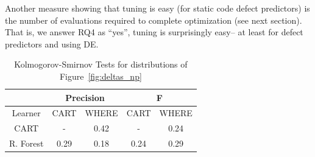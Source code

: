 \documentclass{sig-alternative}
\newcommand{\fig}[1]{Figure~\ref{fig:#1}}
\begin{document}
Another measure showing that tuning is easy 
(for static code defect predictors)
is the number of evaluations required to complete optimization
(see next section). That is, we answer RQ4 as ``yes'', tuning is surprisingly easy-- at least
for defect predictors and using DE.




\begin{table}[!t]
\renewcommand{\baselinestretch}{0.8}
\scriptsize
\centering
  \begin{tabular}{c|c c|cc}
    &   \multicolumn{2}{c|}{Precision} & \multicolumn{2}{c}{F} \\ \hline 
    Learner & CART  & WHERE & CART & WHERE \\
\hline
    CART & - & 0.42 & - & 0.24 \\
    R. Forest &  0.29 & 0.18 & 0.24 & 0.29 \\
  \end{tabular}
    \caption{Kolmogorov-Smirnov Tests for distributions of  \fig{deltas_np}}\label{tab:ks}
\end{table}

\end{document}
